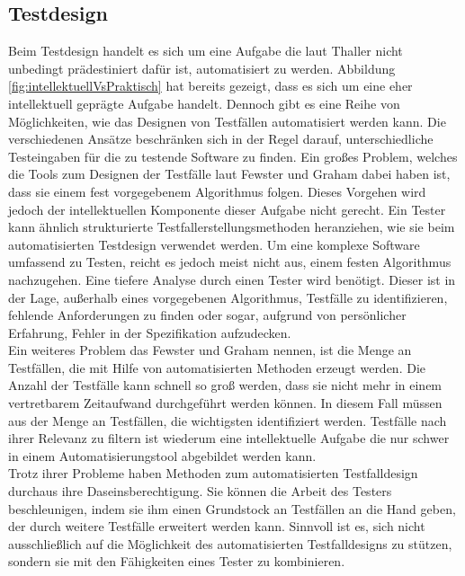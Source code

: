 \subsection{Testdesign}
\label{subsec:testdesign}
Beim Testdesign handelt es sich um eine Aufgabe die laut Thaller \cite[vgl. S. 231]{thaller_software-test_2002} nicht unbedingt prädestiniert dafür ist, automatisiert zu werden. Abbildung \ref{fig:intellektuellVsPraktisch} hat bereits gezeigt, dass es sich um eine eher intellektuell geprägte Aufgabe handelt.
Dennoch gibt es eine Reihe von Möglichkeiten, wie das Designen von Testfällen automatisiert werden kann. Die verschiedenen Ansätze beschränken sich in der Regel darauf, unterschiedliche Testeingaben für die zu testende Software zu finden.
Ein großes Problem, welches die Tools zum Designen der Testfälle laut Fewster und Graham \cite[vgl. S. 19]{fewster_software_1999} dabei haben ist, dass sie einem fest vorgegebenem Algorithmus folgen. Dieses Vorgehen wird jedoch der intellektuellen Komponente dieser Aufgabe nicht gerecht. Ein Tester kann ähnlich strukturierte Testfallerstellungsmethoden heranziehen, wie sie beim automatisierten Testdesign verwendet werden. Um eine komplexe Software umfassend zu Testen, reicht es jedoch meist nicht aus, einem festen Algorithmus nachzugehen. Eine tiefere Analyse durch einen Tester wird benötigt. Dieser ist in der Lage, außerhalb eines vorgegebenen Algorithmus, Testfälle zu identifizieren, fehlende Anforderungen zu finden oder sogar, aufgrund von persönlicher Erfahrung, Fehler in der Spezifikation aufzudecken.\\
Ein weiteres Problem das Fewster und Graham \cite[vgl. S. 19]{fewster_software_1999} nennen, ist die Menge an Testfällen, die mit Hilfe von automatisierten Methoden erzeugt werden. Die Anzahl der Testfälle kann schnell so groß werden, dass sie nicht mehr in einem vertretbarem Zeitaufwand durchgeführt werden können. In diesem Fall müssen aus der Menge an Testfällen, die wichtigsten identifiziert werden. Testfälle nach ihrer Relevanz zu filtern ist wiederum eine intellektuelle Aufgabe die nur schwer in einem Automatisierungstool abgebildet werden kann.\\
Trotz ihrer Probleme haben Methoden zum automatisierten Testfalldesign durchaus ihre Daseinsberechtigung. Sie können die Arbeit des Testers beschleunigen, indem sie ihm einen Grundstock an Testfällen an die Hand geben, der durch weitere Testfälle erweitert werden kann. Sinnvoll ist es, sich nicht ausschließlich auf die Möglichkeit des automatisierten Testfalldesigns zu stützen, sondern sie mit den Fähigkeiten eines Tester zu kombinieren.\\
